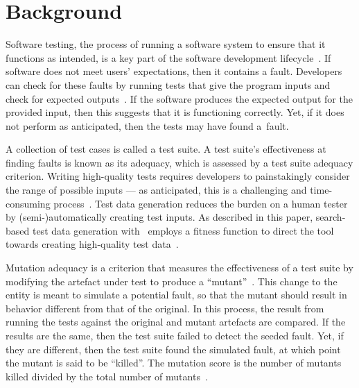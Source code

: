 \section{Background}\label{sec:background}


Software testing, the process of running a software system to ensure that it functions as intended, is a key part of the
software development lifecycle~\cite{Kapfhammer2004}. If software does not meet users' expectations, then it contains a
fault. Developers can check for these faults by running tests that give the program inputs and check for expected
outputs~\cite{Kapfhammer2010}. If the software produces the expected output for the provided input, then this suggests
that it is functioning correctly. Yet, if it does not perform as anticipated, then the tests may have found \mbox{a
fault}.


A collection of test cases is called a test suite. A test suite's effectiveness at finding faults is known as its
adequacy, which is assessed by a test suite adequacy criterion.  Writing high-quality tests requires developers to
painstakingly consider the range of possible inputs --- as anticipated, this is a challenging and time-consuming
process~\cite{Fraser2015}. Test data generation reduces the burden on a human tester by (semi-)automatically creating
test inputs. As described in this paper, search-based test data generation with \sa~employs a fitness function to direct
the tool towards creating high-quality test data~\cite{STVR:STVR294}.



Mutation adequacy is a criterion that measures the effectiveness of a test suite by modifying the artefact under test to
produce a ``mutant''~\cite{Just2011a}. This change to the entity is meant to simulate a potential fault, so that the
mutant should result in behavior different from that of the original. In this process, the result from running the tests
against the original and mutant artefacts are compared. If the results are the same, then the test suite failed to
detect the seeded fault. Yet, if they are different, then the test suite found the simulated fault, at which point the
mutant is said to be ``killed''. The mutation score is the number of mutants killed divided by the total number of
mutants~\cite{Just2012b}.

